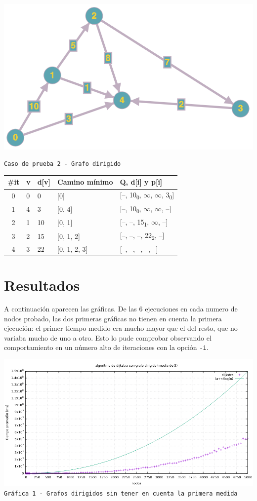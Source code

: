 \documentclass[12pt , a4paper]{article}
\begin{document}
\begin{center}
	
	\includegraphics[width=0.5\hsize]{prueba2.png}
	
	\texttt{Caso de prueba 2 - Grafo dirigido}
	\newline
	
	\begin{tabular}{c|*{3}{l|}l}
		
		\#it	& v & d[v] & Camino mínimo & Q, d[i] y p[i] \\[0.1cm]
		\hline
		0 		& 0 & 0    & [0]           & [--, 10\textsubscript{0}, $\infty$, $\infty$, 3\textsubscript{0}]\\[0.07cm]
		1 		& 4 & 3    & [0, 4]        & [--, 10\textsubscript{0}, $\infty$, $\infty$, --]\\[0.07cm]
		2 		& 1 & 10   & [0, 1]        & [--, --, 15\textsubscript{1}, $\infty$, --]\\[0.07cm]
		3 		& 2 & 15   & [0, 1, 2]     & [--, --, --, 22\textsubscript{2}, --]\\[0.07cm]
		4 		& 3 & 22   & [0, 1, 2, 3]     & [--, --, --, --, --]\\[0.07cm]

	\end{tabular}
	
\end{center}	
\newpage
\section{Resultados}

	A continuación aparecen las gráficas. De las 6 ejecuciones en cada numero de nodos probado, las dos primeras gráficas no tienen en cuenta la primera ejecución: el primer tiempo medido era mucho mayor que el del resto, que no variaba mucho de uno a otro. Esto lo pude comprobar observando el comportamiento en un número alto de iteraciones con la opción \texttt{-i}.
	
	\hspace*{-.15\linewidth}
	\includegraphics[width=1.25\hsize]{dir5.png}
	\texttt{Gráfica 1 - Grafos dirigidos sin tener en cuenta la primera medida}
	\newline
	
\end{document}
